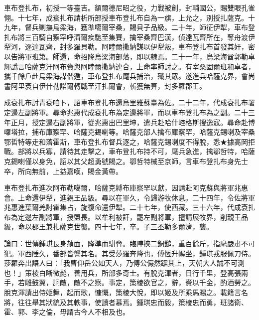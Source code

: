 \begin{pinyinscope}
車布登扎布，初授一等臺吉。額爾德尼昭之役，力戰被創，封輔國公，賜雙眼孔雀翎。十七年，成袞扎布請析所部授車布登扎布自為一旗，上允之，別授扎薩克。十九年，督兵剿撫烏梁海，獲準噶爾宰桑，賜貝子品級。二十年，師征伊犁，車布登扎布將三百騎自察罕呼濟爾疾馳至集賽，擒宰桑齊巴漢，偵達瓦齊所在，奪舟渡伊犁河，逐達瓦齊，封多羅貝勒。阿睦爾撒納謀以伊犁叛，車布登扎布首發其奸，密以告將軍班第。師還，命招降烏梁海部落，即以隸焉。二十一年，烏梁海酋郭勒卓輝譌言哈薩克汗阿布賚與阿睦爾撒納連合，上命率師討之。有宰桑固爾班和卓者，攜千餘戶赴烏梁海謀偕遁，車布登扎布麾兵捕治，殲其眾。遂進兵哈薩克界，會尚書阿里袞自伊什勒諾爾轉戰至汗扎爾會，斬獲無算，封多羅郡王。

成袞扎布討青袞咱卜，詔車布登扎布還烏里雅蘇臺為佐。二十二年，代成袞扎布署定邊左副將軍。尋命兆惠代成袞扎布為定邊將軍，而以車布登扎布為之副。二十三年正月，授定邊右副將軍，從兆惠出巴里坤，遣兵赴哈什崆格斯搜逸寇。尋命赴博囉塔拉，捕布庫察罕、哈薩克錫喇等。哈薩克部人擒布庫察罕，哈薩克錫喇及宰桑鄂哲特等走和落霍斯，車布登扎布督兵逐之，哈薩克錫喇度不得脫，悉★據高岡拒戰。部將以兵寡，請待其走擊之，車布登扎布持不可，麾兵急進，擒鄂哲特，哈薩克錫喇僅以身免，詔以其父超勇號賜之。鄂哲特械至京師，言車布登扎布身先士卒，所向無前，上益嘉嘆，賜金黃帶。

車布登扎布進次阿布勒噶爾，哈薩克縛布庫察罕以獻，因請赴阿克蘇與將軍兆惠會。上命還伊犁，進親王品級。尋以在軍久，令歸游牧休息。二十四年，令佐將軍兆惠進葉爾羌討霍集占，旋復命還伊犁。二十七年，使西藏。三十六年，代成袞扎布為定邊左副將軍，授盟長。以牟利被訐，罷左副將軍，擅請展牧界，削親王品級，命以郡王兼扎薩克世襲。四十七年，卒。子三丕勒多爾濟，襲。

論曰：世傳鍾琪長身赬面，隆準而駢脅。臨陣挾二銅鎚，重百餘斤，指麾嚴肅不可犯。軍西陲久，番部皆讋其名。其受莎羅奔降也，傅恆升幄坐，鍾琪戎服佩刀侍。莎羅奔出語人曰：「我曹仰岳公如天人，乃傅公儼然踞其上，天朝大人誠不可測也！」策棱白晰微髭，善用兵，所部多奇士。有脫克渾者，日行千里，登高張兩手，若雕鼓翼，詗敵，敵不之察。事定，策棱欲官之，辭，賚以千金，酌酒勞之。脫克渾請出侍姬舞，起而歌，慷慨，策棱大悅，即以姬及所乘馬賜之。載籍言名將，往往舉其狀貌及其軼事，使讀者慕焉。鍾琪忠而毅，策棱忠而勇，班諸衛、霍、郭、李之倫，毋謂古今人不相及也。


\end{pinyinscope}